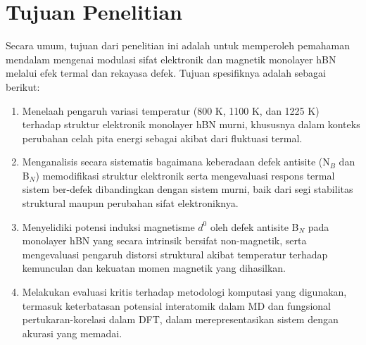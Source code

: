 \section{Tujuan Penelitian}
Secara umum, tujuan dari penelitian ini adalah untuk memperoleh pemahaman mendalam mengenai modulasi sifat elektronik dan magnetik monolayer hBN melalui efek termal dan rekayasa defek. Tujuan spesifiknya adalah sebagai berikut:
\begin{enumerate}
\item Menelaah pengaruh variasi temperatur (800 K, 1100 K, dan 1225 K) terhadap struktur elektronik monolayer hBN murni, khususnya dalam konteks perubahan celah pita energi sebagai akibat dari fluktuasi termal.

\item Menganalisis secara sistematis bagaimana keberadaan defek antisite (N$_B$ dan B$_N$) memodifikasi struktur elektronik serta mengevaluasi respons termal sistem ber-defek dibandingkan dengan sistem murni, baik dari segi stabilitas struktural maupun perubahan sifat elektroniknya.

\item Menyelidiki potensi induksi magnetisme $d^0$ oleh defek antisite B$_N$ pada monolayer hBN yang secara intrinsik bersifat non-magnetik, serta mengevaluasi pengaruh distorsi struktural akibat temperatur terhadap kemunculan dan kekuatan momen magnetik yang dihasilkan.

\item Melakukan evaluasi kritis terhadap metodologi komputasi yang digunakan, termasuk keterbatasan potensial interatomik dalam MD dan fungsional pertukaran-korelasi dalam DFT, dalam merepresentasikan sistem dengan akurasi yang memadai.
\end{enumerate}

